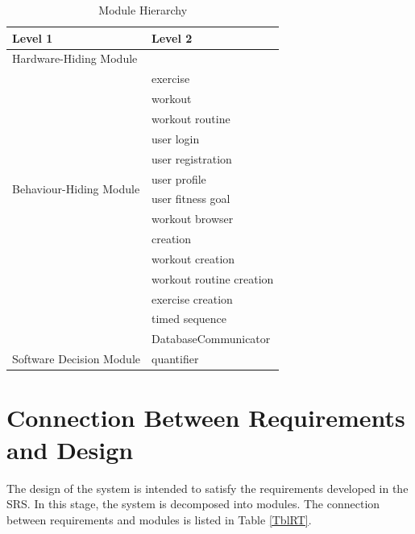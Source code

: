 \documentclass[12pt, titlepage]{article}
\begin{document}
\begin{table}[h!]
\centering
\begin{tabular}{p{} p{}}
\toprule
\textbf{Level 1} & \textbf{Level 2}\\
\midrule

{Hardware-Hiding Module} & ~ \\
\midrule

\multirow{12}{0.3\textwidth}{Behaviour-Hiding Module}
& exercise\\
& workout\\
& workout routine\\
& user login\\
& user registration\\
& user profile\\ 
& user fitness goal\\
& workout browser\\
& creation\\
& workout creation\\
& workout routine creation\\
& exercise creation\\
& timed sequence\\
& DatabaseCommunicator\\
\midrule

\multirow{1}{0.3\textwidth}{Software Decision Module}
& quantifier\\
\bottomrule

\end{tabular}
\caption{Module Hierarchy}
\label{TblMH}
\end{table}

\newpage
\section{Connection Between Requirements and Design} \label{SecConnection}

The design of the system is intended to satisfy the requirements developed in
the SRS. In this stage, the system is decomposed into modules. The connection
between requirements and modules is listed in Table \ref{TblRT}.

\newpage
\end{document}
